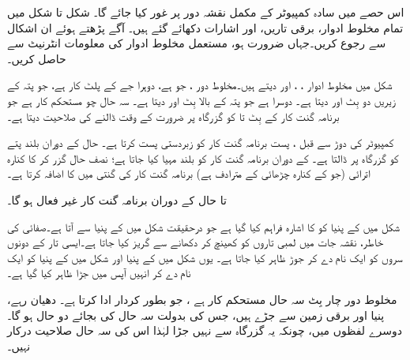 اس حصے میں سادہ کمپیوٹر کے مکمل نقشہ دور پر غور کیا جائے گا۔ شکل    تا شکل   میں تمام مخلوط ادوار، برقی تاریں، اور اشارات دکھائے گئے ہیں۔ آگے پڑھتے ہوئے ان  اشکال سے رجوع کریں۔جہاں ضرورت ہو، مستعمل  مخلوط ادوار  کی معلومات انٹرنیٹ سے حاصل کریں۔

شکل  میں مخلوط ادوار ، ، اور   دیتے ہیں۔مخلوط دور    ، جو  ہے، دوہرا جے کے پلٹ کار ہے، جو پتہ کے  زیریں دو بِٹ  اور  دیتا ہے۔  دوسرا   ہے جو پتہ کے بالا بِٹ  اور  دیتا ہے۔     سہ حال چو   مستحکم کار ہے جو برنامہ گنت کار  کے بِٹ  تا  کو  گزرگاہ پر ضرورت کے وقت ڈالنے کی صلاحیت دیتا ہے۔

کمپیوٹر کی دوڑ سے قبل ، پست  برنامہ گنت کار کو  زبردستی پست   کرتا ہے۔  حال کے دوران بلند  پتے کو  گزرگاہ پر ڈالتا ہے۔    کے دوران  برنامہ گنت کار کو بلند  مہیا کیا جاتا ہے؛  نصف حال گزر کر  کا  کنارہ اترائی (جو  کے کنارہ چڑھائی کے مترادف ہے) برنامہ گنت کار  کی گنتی میں  کا اضافہ کرتا ہے۔

  تا  حال کے دوران برنامہ گنت کار  غیر فعال ہو گا۔
 
 شکل  میں   کے پنیا   کو  کا اشارہ فراہم کیا گیا ہے جو  درحقیقت شکل  میں   کے پنیا  سے آتا ہے۔صفائی کی خاطر،  نقشہ جات میں لمبی تاروں کو کھینچ کر دکھانے سے گریز کیا جاتا ہے۔ایسی تار کے دونوں سروں کو ایک نام دے کر جوڑ ظاہر کیا جاتا ہے۔ یوں   شکل  میں   کے پنیا   اور   شکل  میں   کے پنیا  کو ایک نام  دے کر  انہیں آپس میں جڑا ظاہر کیا گیا ہے۔
 
 مخلوط دور      چار بِٹ   سہ حال  مستحکم کار ہے ، جو  بطور   کردار ادا کرتا ہے۔ دھیان  رہے، پنیا  اور   برقی زمین سے جڑے ہیں، جس کی بدولت  سہ حال کی بجائے دو حال ہو گا۔ دوسرے  لفظوں میں، چونکہ یہ گزرگاہ سے نہیں جڑا لہٰذا  اس کی سہ حال صلاحیت درکار نہیں۔
 
